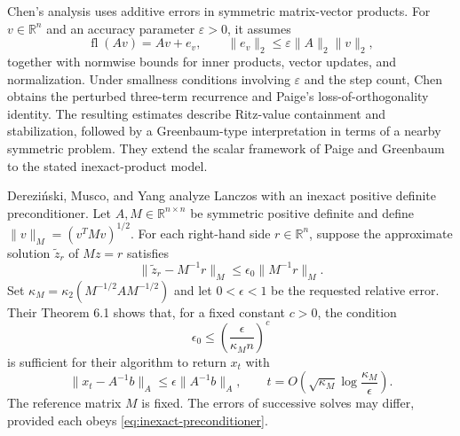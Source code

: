 \documentclass[11pt]{article}
\theoremstyle{definition}
\newcommand{\fl}{\operatorname{fl}}
\newcommand{\R}{\mathbb{R}}
\begin{document}
Chen's analysis \cite{Chen2026Simple} uses additive errors in symmetric
matrix-vector products. For $v\in\R^n$ and an accuracy parameter
$\varepsilon>0$, it assumes
\begin{equation}
 \fl(Av)=Av+e_v,\qquad
 \|e_v\|_2\le\varepsilon\|A\|_2\|v\|_2,
 \label{eq:inexact-product-model}
\end{equation}
together with normwise bounds for inner products, vector updates, and
normalization. Under smallness conditions involving $\varepsilon$ and the
step count, Chen obtains the perturbed three-term recurrence and Paige's
loss-of-orthogonality identity. The resulting estimates describe Ritz-value
containment and stabilization, followed by a Greenbaum-type interpretation
in terms of a nearby symmetric problem. They extend the scalar framework
of Paige and Greenbaum \cite{Paige1976,Paige1980,Greenbaum1989} to the
stated inexact-product model.

Derezi\'nski, Musco, and Yang \cite[Sec.~6]{DerezinskiMuscoYang2025}
analyze Lanczos with an inexact positive definite preconditioner.
Let $A,M\in\R^{n\times n}$ be symmetric positive definite and define
$\|v\|_M=(v^TMv)^{1/2}$. For each right-hand side $r\in\R^n$, suppose
the approximate solution $\widetilde z_r$ of $Mz=r$ satisfies
\begin{equation}
 \|\widetilde z_r-M^{-1}r\|_M
 \le\epsilon_0\|M^{-1}r\|_M.
 \label{eq:inexact-preconditioner}
\end{equation}
Set $\kappa_M=\kappa_2(M^{-1/2}AM^{-1/2})$ and let $0<\epsilon<1$ be
the requested relative error. Their Theorem 6.1 shows that, for a fixed
constant $c>0$, the condition
\begin{equation}
 \epsilon_0\le\left(\frac{\epsilon}{\kappa_M n}\right)^c
 \label{eq:dmy-accuracy}
\end{equation}
is sufficient for their algorithm to return $x_t$ with
\begin{equation}
 \|x_t-A^{-1}b\|_A\le\epsilon\|A^{-1}b\|_A,
 \qquad
 t=O\!\left(\sqrt{\kappa_M}\log\frac{\kappa_M}{\epsilon}\right).
 \label{eq:dmy-convergence}
\end{equation}
The reference matrix $M$ is fixed. The errors of successive solves may
differ, provided each obeys \eqref{eq:inexact-preconditioner}.
\end{document}
